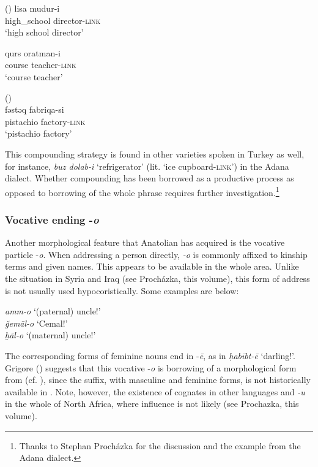 \documentclass[output=paper]{langsci/langscibook}
\begin{document}
\ea \label{coms}   (\citealt[41]{AkkusBenmamoun2018})
		\ea \label{com1}\gll lisa		mudur-i\\
    high\_school director-\textsc{link} \\
        \glt `high school director'


	\ex \label{com2} \gll qurs 	oratman-i  \\
        course	teacher-\textsc{link}\\
        \glt `course teacher'
\z
\z

      \ea \label{comt}   (\citealt[199]{Lahdo2009})\\
      \gll fəstəq fabriqa-si \\
        pistachio factory-\textsc{link}\\
        \glt `pistachio factory'
\z

\noindent This compounding strategy is found in other  varieties spoken in Turkey as well, for instance, \textit{buz dolab-i} `refrigerator' (lit. `ice cupboard-\textsc{link}') in the Adana dialect. Whether compounding has been borrowed as a productive process as opposed to borrowing of the whole phrase requires further investigation.\footnote{Thanks to Stephan Proch\'{a}zka for the discussion and the example from the Adana dialect.}



\subsubsection{Vocative ending -\textit{o}}
Another morphological feature that Anatolian  has acquired is the {vocative} particle -\textit{o}. When addressing a person directly, \textit{-o} is commonly affixed to kinship terms and given names. This appears to be available in the whole area. Unlike the situation in Syria and Iraq (see Proch\'{a}zka, this volume), this form of address is not usually used hypocoristically. Some examples are below:

\ea
\noindent \textit{amm-o} `(paternal) uncle!'\\
\textit{ǧem\={a}l-o} `Cemal!'\\
\textit{ḫāl-o} `(maternal) uncle!'\\
\z

\noindent The corresponding forms of feminine nouns end in -\textit{\={e}}, as in \textit{ḥabībt-ē} `darling!'. Grigore (\citeyear[203]{Grigore2007book}) suggests that this {vocative} -\textit{o} is borrowing of a morphological form from  (cf. \citealt{HaigÖpengin2018}), since the suffix, with masculine and feminine forms, is not historically available in . Note, however, the existence of cognates in other  languages and \textit{-u} in the whole of North Africa, where  influence is not likely (see Prochazka, this volume).
\end{document}

